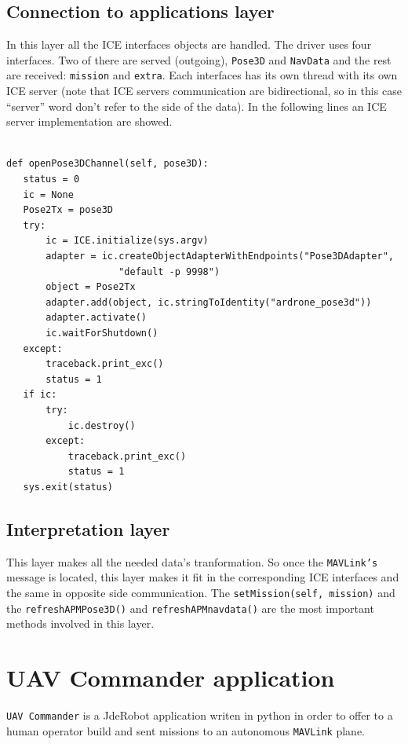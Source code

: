 \documentclass{llncs}
\begin{document}
\subsection{Connection to applications layer}
\label{sec:apm_jderobot_comunication}

In this layer all the ICE interfaces objects are handled. The driver uses four interfaces. Two of there are served (outgoing), \texttt{Pose3D} and \texttt{NavData} and the rest are received: \texttt{mission} and \texttt{extra}.
Each interfaces has its own thread with its own ICE server (note that ICE servers communication are bidirectional, so in this case ``server'' word don't refer to the side of the data).
In the following lines an ICE server implementation are showed.
{\scriptsize
\begin{lstlisting}

def openPose3DChannel(self, pose3D):
   status = 0
   ic = None
   Pose2Tx = pose3D
   try:
       ic = ICE.initialize(sys.argv)
       adapter = ic.createObjectAdapterWithEndpoints("Pose3DAdapter", 
       				"default -p 9998")
       object = Pose2Tx
       adapter.add(object, ic.stringToIdentity("ardrone_pose3d")) 
       adapter.activate()
       ic.waitForShutdown()
   except:
       traceback.print_exc()
       status = 1
   if ic:
       try:
           ic.destroy()
       except:
           traceback.print_exc()
           status = 1
   sys.exit(status)
\end{lstlisting}}

\subsection{Interpretation layer}
\label{interpretation_layer}

This layer makes all the needed data's tranformation. So once the \texttt{MAVLink's} message is located, this layer makes it fit in the corresponding ICE interfaces and the same in opposite side communication. 
The \texttt{setMission(self, mission)} and the \texttt{refreshAPMPose3D()} and
\texttt{refreshAPMnavdata()} are the most important methods involved in this layer.

\section{UAV Commander application}

\texttt{UAV Commander} is a JdeRobot application writen in python in order to offer to a human operator build and sent missions to an autonomous \texttt{MAVLink} plane.
\end{document}
